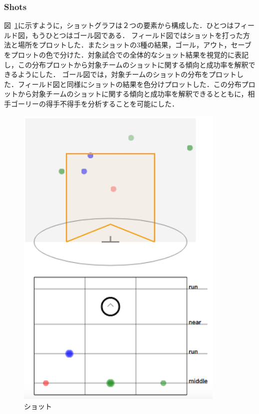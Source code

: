 \documentclass[sotsuron]{kuee}
\begin{document}
			\subsubsection{Shots}
				図~\ref{fig:shots}に示すように，ショットグラフは２つの要素から構成した．ひとつはフィールド図，もうひとつはゴール図である．
				フィールド図ではショットを打った方法と場所をプロットした．またショットの3種の結果，ゴール，アウト，セーブをプロットの色で分けた．対象試合での全体的なショット結果を視覚的に表記し，この分布プロットから対象チームのショットに関する傾向と成功率を解釈できるようにした．
				ゴール図では，対象チームのショットの分布をプロットした．フィールド図と同様にショットの結果を色分けプロットした．この分布プロットから対象チームのショットに関する傾向と成功率を解釈できるとともに，相手ゴーリーの得手不得手を分析することを可能にした．
					\begin{figure}
						\begin{center}
							\includegraphics[width=10cm]{./png/shots.png}
						\end{center}
						\caption{ショット}
				  		\label{fig:shots}
					\end{figure}
\end{document}
